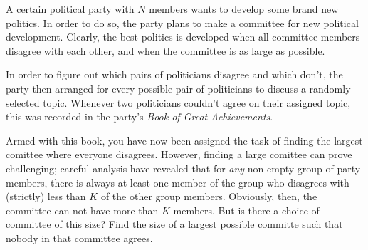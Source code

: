 
\noindent
A certain political party with $N$ members wants to develop some brand new politics. In order to do so, the party plans to make a committee for new political development. Clearly, the best politics is developed when all committee members disagree with each other, and when the committee is as large as possible.

In order to figure out which pairs of politicians disagree and which don't, the party then arranged for every possible pair of politicians to discuss a randomly selected topic. Whenever two politicians couldn't agree on their assigned topic, this was recorded in the party's \emph{Book of Great Achievements}.

Armed with this book, you have now been assigned the task of finding the largest comittee where everyone disagrees. However, finding a large comittee can prove challenging; careful analysis have revealed that for \emph{any} non-empty group of party members, there is always at least one member of the group who disagrees with (strictly) less than $K$ of the other group members.
%
Obviously, then, the committee can not have more than $K$ members. But is there a choice of committee of this size? Find the size of a largest possible committe such that nobody in that committee agrees.

